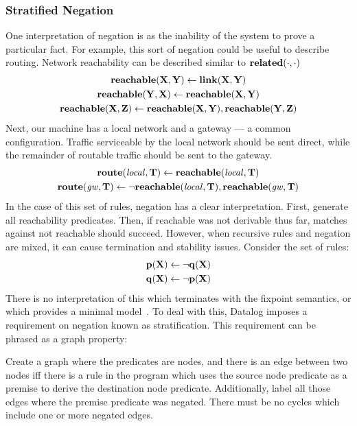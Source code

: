 \subsubsection{Stratified Negation}
One interpretation of negation is as the inability of the system to prove a particular fact.
For example, this sort of negation could be useful to describe routing.
Network reachability can be described similar to ${\bf related}(\cdot, \cdot)$
\begin{gather*}
        {\bf reachable}({\bf X}, {\bf Y}) \leftarrow {\bf link}({\bf X}, {\bf Y})\\
        {\bf reachable}({\bf Y}, {\bf X}) \leftarrow {\bf reachable}({\bf X}, {\bf Y})\\
        {\bf reachable}({\bf X}, {\bf Z}) \leftarrow {\bf reachable}({\bf X}, {\bf Y}), {\bf reachable}({\bf Y}, {\bf Z})
\end{gather*}
Next, our machine has a local network and a gateway --- a common configuration.
Traffic serviceable by the local network should be sent direct, while the remainder of routable traffic should be sent to the gateway.
\begin{gather*}
        {\bf route}({\it local}, {\bf T}) \leftarrow {\bf reachable}({\it local}, {\bf T})\\
        {\bf route}({\it gw}, {\bf T}) \leftarrow \neg {\bf reachable}({\it local}, {\bf T}), {\bf reachable}({\it gw}, {\bf T})
\end{gather*}
In the case of this set of rules, negation has a clear interpretation.
First, generate all reachability predicates.
Then, if reachable was not derivable thus far, matches against not reachable should succeed.
However, when recursive rules and negation are mixed, it can cause termination and stability issues. Consider the set of rules:
\begin{gather*}
        {\bf p}({\bf X}) \leftarrow \neg {\bf q}({\bf X})\\
        {\bf q}({\bf X}) \leftarrow \neg {\bf p}({\bf X})
\end{gather*}
There is no interpretation of this which terminates with the fixpoint semantics, or which provides a minimal model~\cite{prologbook}.
To deal with this, Datalog imposes a requirement on negation known as stratification.
This requirement can be phrased as a graph property:

Create a graph where the predicates are nodes, and there is an edge between two nodes iff there is a rule in the program which uses the source node predicate as a premise to derive the destination node predicate.
Additionally, label all those edges where the premise predicate was negated.
There must be no cycles which include one or more negated edges.

